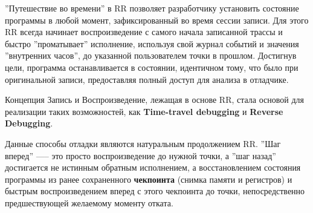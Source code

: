 ''Путешествие во времени'' в RR позволяет разработчику установить состояние
программы в любой момент, зафиксированный во время сессии записи. Для этого RR
всегда начинает воспроизведение с самого начала записанной трассы и быстро
''проматывает'' исполнение, используя свой журнал событий и значения ''внутренних
часов'', до указанной пользователем точки в прошлом. Достигнув цели, программа
останавливается в состоянии, идентичном тому, что было при оригинальной записи,
предоставляя полный доступ для анализа в отладчике.

Концепция Запись и Воспроизведение, лежащая в основе RR, стала основой для
реализации таких возможностей, как \textbf{Time-travel debugging} и
\textbf{Reverse Debugging}.


Данные способы отладки являются натуральным продолжением RR. ''Шаг вперед'' —--
это просто воспроизведение до нужной точки, а ''шаг назад'' достигается не
истинным обратным исполнением, а восстановлением состояния программы из ранее
сохраненного \textbf{чекпоинта} (снимка памяти и регистров) и быстрым
воспроизведением вперед с этого чекпоинта до точки, непосредственно
предшествующей желаемому моменту отката.

